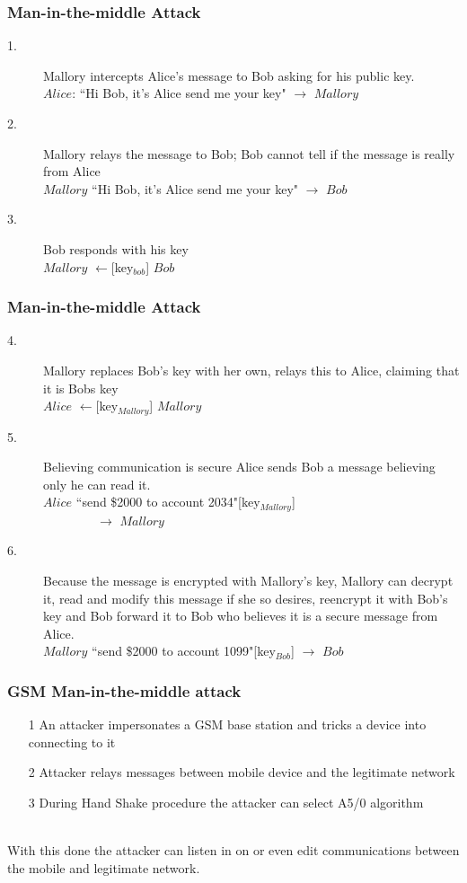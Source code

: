 \documentclass{beamer}
\begin{document}
		\begin{frame}
	\frametitle{Man-in-the-middle Attack}
		\begin{description}
	\item[1.] Mallory intercepts Alice's message to Bob asking for his public key.\hfill\\
	$Alice$: ``Hi Bob, it's Alice send me your key" $\rightarrow$ $Mallory$
	\item[2.] Mallory relays the message to Bob; Bob cannot tell if the message is really from Alice \hfill\\
	 $Mallory$ ``Hi Bob, it's Alice send me your key" $\rightarrow$ $Bob$ 	
	\item[3.]Bob responds with his key \hfill\\
	$Mallory$ $\leftarrow$[key$_{bob}$]  $Bob$
	\end{description}
	\end{frame}
	\begin{frame}
	\frametitle{Man-in-the-middle Attack}
	\begin{description}
	
	\item[4.] Mallory replaces Bob's key with her own, relays this to  Alice, claiming that it is Bobs key\hfill\\
	$Alice$ $\leftarrow$[key$_{Mallory}$] $Mallory$
	\item[5.]
	Believing communication is secure Alice sends Bob a message believing only he can read it. \hfill\\
	$Alice$ ``send \$2000 to account 2034"[key$_{Mallory}$] \\
	$~\quad\quad\quad\quad\rightarrow$ $Mallory$
	\item[6.] Because the message is encrypted with Mallory's key, Mallory can decrypt it, read and modify this message if she so desires, reencrypt it with Bob's key and Bob forward it to Bob who believes it is a secure message from Alice. \hfill\\
	$Mallory$ ``send \$2000 to account 1099"[key$_{Bob}$] $\rightarrow$ $Bob$
	\end{description}	
\end{frame}
\begin{frame}
	\frametitle{GSM Man-in-the-middle attack}
	
	\begin{itemize}
	 \item [1] An attacker impersonates a GSM base station and tricks a device into connecting to it
	 \item[2] Attacker relays messages between mobile device and the legitimate network
	\item[3] During Hand Shake procedure the attacker can select A5/0 algorithm  
	\end{itemize}
	\\
With this done the attacker can listen in on or even edit communications between the mobile and legitimate network.
	
\end{frame}
\end{document}
